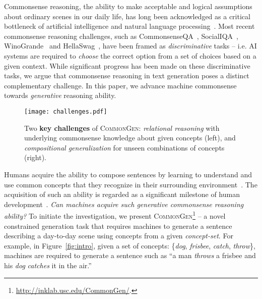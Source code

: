 \documentclass[11pt,a4paper]{article}
\begin{document}
Commonsense reasoning, 
the ability to make acceptable and logical assumptions about ordinary scenes in our daily life,
has long been acknowledged as a critical bottleneck of artificial intelligence and natural language processing~\cite{davis2015commonsense}.
Most recent commonsense reasoning challenges, such as CommonsenseQA~\cite{Talmor2018CommonsenseQAAQ}, SocialIQA~\cite{sap-etal-2019-social}, WinoGrande~\cite{Sakaguchi2019WINOGRANDEAA} and HellaSwag~\cite{Zellers2019HellaSwagCA}, have been framed as \textit{discriminative} tasks -- i.e. AI systems are required to \textit{choose} the correct option from a set of choices based on a given context. 
While significant progress has been made on these discriminative tasks, 
we argue that commonsense reasoning in text generation poses a distinct complementary challenge.
In this paper, we advance machine commonsense towards \textit{generative} reasoning ability.


	\begin{figure*}[h!]
		\centering
		\texttt{[image: challenges.pdf]}
		\caption{\small{Two \textbf{key challenges} of \textsc{CommonGen}:  \textit{relational reasoning} with underlying commonsense knowledge about given concepts (left), and \textit{compositional generalization} for  unseen combinations of concepts (right).}}
		\label{fig:challenges}
	\end{figure*}
Humans acquire the ability to compose sentences by learning to understand and use common concepts that they recognize in their surrounding environment~\cite{tincoff1999some}. The acquisition of such an ability is regarded as a significant milestone of human development~\cite{moore2013development}.  \textit{Can machines acquire such generative commonsense reasoning ability?} 
To initiate the investigation, we present \textsc{CommonGen}\footnote{\url{http://inklab.usc.edu/CommonGen/}.} -- a novel constrained generation task that requires machines to generate a sentence describing a day-to-day scene using concepts from a given \textit{concept-set}. 
For example, in Figure~\ref{fig:intro}, given a set of concepts: \{\textit{dog}, \textit{frisbee}, \textit{catch}, \textit{throw}\}, machines are required to generate a sentence such as ``a man \textit{throws} a {frisbee} and his \textit{dog} \textit{catches} it in the air.''
\end{document}
